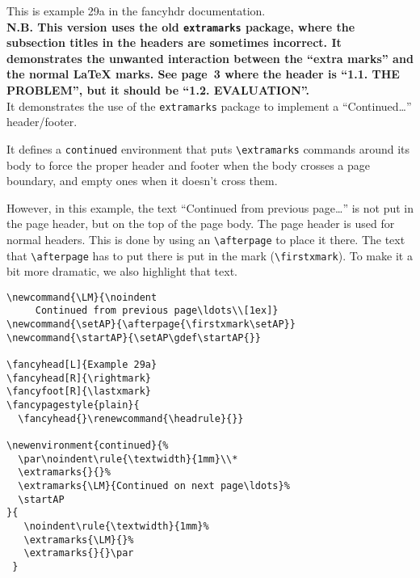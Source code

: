 \documentclass{report}
\newcommand{\LM}{\noindent\hl{Continued from previous page\ldots}\\[1ex]}
\newcommand{\setAP}{\afterpage{\firstxmark\setAP}}
\newcommand{\startAP}{\setAP\gdef\startAP{}}
\begin{document}
\tableofcontents

\thispagestyle{plain}
\noindent
\begin{boxedminipage}{\textwidth}
This is example 29a in the fancyhdr documentation.
\\[1ex]
\textbf{N.B. This version uses the old \texttt{extramarks} package, where the subsection titles in the headers are sometimes incorrect. It demonstrates the unwanted interaction between the ``extra marks'' and the normal \LaTeX{} marks. See page~3 where the header is ``1.1. THE PROBLEM'', but it should be ``1.2. EVALUATION''.}
\\[1ex]
It demonstrates the use of the \texttt{extramarks} package to implement
a ``Continued\ldots'' header/footer.

It defines a \texttt{continued} environment that puts \verb|\extramarks| commands around its body to force the proper header and footer when the body crosses a page boundary, and empty ones when it doesn't cross them.

However, in this example, the text ``Continued from previous page\ldots'' is not put in the page header, but on the top of the page body. The page header is used for normal headers. This is done by using an \verb|\afterpage| to place it there. The text that \verb|\afterpage| has to put there is put in the mark (\verb|\firstxmark|). To make it a bit more dramatic, we also highlight that text.

\begin{verbatim}
\newcommand{\LM}{\noindent
     Continued from previous page\ldots\\[1ex]}
\newcommand{\setAP}{\afterpage{\firstxmark\setAP}}
\newcommand{\startAP}{\setAP\gdef\startAP{}}

\fancyhead[L]{Example 29a}
\fancyhead[R]{\rightmark}
\fancyfoot[R]{\lastxmark}
\fancypagestyle{plain}{
  \fancyhead{}\renewcommand{\headrule}{}}

\newenvironment{continued}{%
  \par\noindent\rule{\textwidth}{1mm}\\*
  \extramarks{}{}%
  \extramarks{\LM}{Continued on next page\ldots}%
  \startAP
}{
   \noindent\rule{\textwidth}{1mm}%
   \extramarks{\LM}{}%
   \extramarks{}{}\par
 }
\end{verbatim}

\end{boxedminipage}

\pagestyle{fancy}
\end{document}
